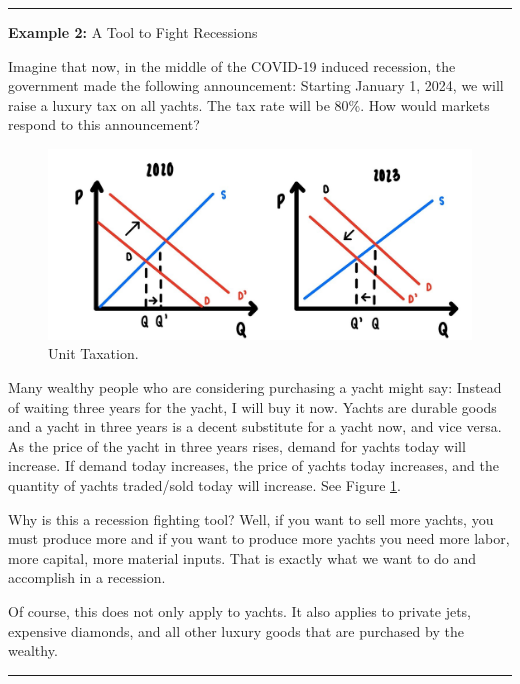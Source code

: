\documentclass[
]{book}
\begin{document}
\begin{center}\rule{0.5\linewidth}{0.5pt}\end{center}

\textbf{Example 2:} A Tool to Fight Recessions

Imagine that now, in the middle of the COVID-19 induced recession, the government made the following announcement: Starting January 1, 2024, we will raise a luxury tax on all yachts. The tax rate will be 80\%. How would markets respond to this announcement?

\begin{figure}

{\centering \includegraphics[width=0.9\linewidth]{img/compmarkets/fig6} 

}

\caption{Unit Taxation.}\label{fig:compmarkets06}
\end{figure}

Many wealthy people who are considering purchasing a yacht might say: Instead of waiting three years for the yacht, I will buy it now. Yachts are durable goods and a yacht in three years is a decent substitute for a yacht now, and vice versa. As the price of the yacht in three years rises, demand for yachts today will increase. If demand today increases, the price of yachts today increases, and the quantity of yachts traded/sold today will increase. See Figure \ref{fig:compmarkets06}.

Why is this a recession fighting tool? Well, if you want to sell more yachts, you must produce more and if you want to produce more yachts you need more labor, more capital, more material inputs. That is exactly what we want to do and accomplish in a recession.

Of course, this does not only apply to yachts. It also applies to private jets, expensive diamonds, and all other luxury goods that are purchased by the wealthy.

\begin{center}\rule{0.5\linewidth}{0.5pt}\end{center}
\end{document}
